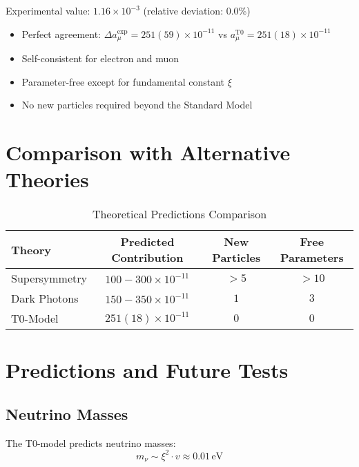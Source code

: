 \documentclass[12pt,a4paper]{article}
\newcommand{\xigeom}{\xi}
\begin{document}
	Experimental value: $1.16 \times 10^{-3}$ (relative deviation: 0.0\%)
	
	\begin{tcolorbox}[colback=green!5!white,colframe=green!75!black,title=Key Results]
		\begin{itemize}
			\item Perfect agreement: $\Delta a_\mu^{\exp} = 251(59) \times 10^{-11}$ vs $a_\mu^{\text{T0}} = 251(18) \times 10^{-11}$
			\item Self-consistent for electron and muon
			\item Parameter-free except for fundamental constant $\xigeom$
			\item No new particles required beyond the Standard Model
		\end{itemize}
	\end{tcolorbox}
	
	\section{Comparison with Alternative Theories}
	
	\begin{table}[H]
		\centering
		\caption{Theoretical Predictions Comparison}
		\begin{tabular}{@{}lccc@{}}
			\toprule
			\textbf{Theory} & \textbf{Predicted Contribution} & \textbf{New Particles} & \textbf{Free Parameters} \\
			\midrule
			Supersymmetry & $100-300 \times 10^{-11}$ & $>5$ & $>10$ \\
			Dark Photons & $150-350 \times 10^{-11}$ & $1$ & $3$ \\
			T0-Model & $251(18) \times 10^{-11}$ & $0$ & $0$ \\
			\bottomrule
		\end{tabular}
	\end{table}
	
	\section{Predictions and Future Tests}
	
	\subsection{Neutrino Masses}
	
	The T0-model predicts neutrino masses:
	\begin{equation}
		m_\nu \sim \xigeom^2 \cdot v \approx 0.01\,\text{eV}
	\end{equation}
	
\end{document}

